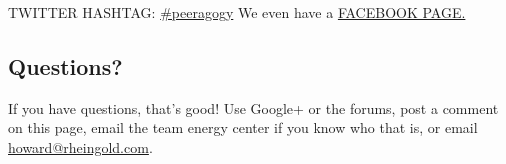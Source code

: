 TWITTER HASHTAG:
\href{http://twitter.com/search?q=\%23peeragogy\&src=typd}{\#peeragogy}
We even have a \href{https://www.facebook.com/peeragogy}{FACEBOOK PAGE.}



\subsection{Questions?}

If you have questions, that's good! Use Google+ or the forums, post a
comment on this page, email the team energy center if you know who that
is, or email \href{mailto:howard@rheingold.com}{howard@rheingold.com}.
